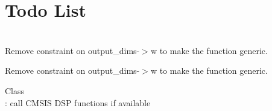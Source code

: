 \chapter{Todo List}
\hypertarget{todo}{}\label{todo}

\begin{DoxyRefList}
\item[Member \doxylink{group___n_n_conv_ga6c569efc46ae1c38df1335888fc7873d}{arm\+\_\+convolve\+\_\+1\+\_\+x\+\_\+n\+\_\+s8} (const \doxylink{structcmsis__nn__context}{cmsis\+\_\+nn\+\_\+context} \texorpdfstring{$\ast$}{*}ctx, const \doxylink{structcmsis__nn__conv__params}{cmsis\+\_\+nn\+\_\+conv\+\_\+params} \texorpdfstring{$\ast$}{*}conv\+\_\+params, const \doxylink{structcmsis__nn__per__channel__quant__params}{cmsis\+\_\+nn\+\_\+per\+\_\+channel\+\_\+quant\+\_\+params} \texorpdfstring{$\ast$}{*}quant\+\_\+params, const \doxylink{structcmsis__nn__dims}{cmsis\+\_\+nn\+\_\+dims} \texorpdfstring{$\ast$}{*}input\+\_\+dims, const q7\+\_\+t \texorpdfstring{$\ast$}{*}input\+\_\+data, const \doxylink{structcmsis__nn__dims}{cmsis\+\_\+nn\+\_\+dims} \texorpdfstring{$\ast$}{*}filter\+\_\+dims, const q7\+\_\+t \texorpdfstring{$\ast$}{*}filter\+\_\+data, const \doxylink{structcmsis__nn__dims}{cmsis\+\_\+nn\+\_\+dims} \texorpdfstring{$\ast$}{*}bias\+\_\+dims, const int32\+\_\+t \texorpdfstring{$\ast$}{*}bias\+\_\+data, const \doxylink{structcmsis__nn__dims}{cmsis\+\_\+nn\+\_\+dims} \texorpdfstring{$\ast$}{*}output\+\_\+dims, q7\+\_\+t \texorpdfstring{$\ast$}{*}output\+\_\+data)]\hfill \\
\label{todo__todo000001}%
%
Remove constraint on output\+\_\+dims-\/\texorpdfstring{$>$}{>}w to make the function generic.

\label{todo__todo000002}%
%
Remove constraint on output\+\_\+dims-\/\texorpdfstring{$>$}{>}w to make the function generic. 
\item[Class \doxylink{classei_1_1signal}{ei\+::signal} ]\hfill \\
\label{todo__todo000003}%
%
\+: call CMSIS DSP functions if available 
\end{DoxyRefList}